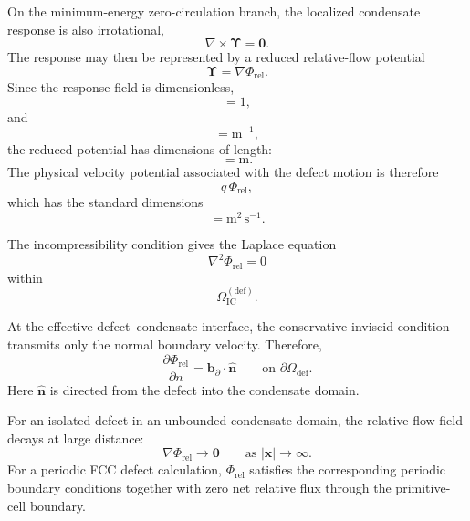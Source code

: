 On the minimum-energy zero-circulation branch, the localized condensate response is also irrotational,
\begin{equation}
    \nabla\times\boldsymbol\Upsilon = \mathbf 0.
\end{equation}
The response may then be represented by a reduced relative-flow potential
\begin{equation}
    \boldsymbol\Upsilon
    =
    \nabla\Phi_{\mathrm{rel}}.
\end{equation}
Since the response field is dimensionless,
\begin{equation}
    [\boldsymbol\Upsilon]=1,
\end{equation}
and
\begin{equation}
    [\nabla]=\mathrm m^{-1},
\end{equation}
the reduced potential has dimensions of length:
\begin{equation}
    [\Phi_{\mathrm{rel}}]=\mathrm m.
\end{equation}
The physical velocity potential associated with the defect motion is therefore
\begin{equation}
    \dot q\,\Phi_{\mathrm{rel}},
\end{equation}
which has the standard dimensions
\begin{equation}
    [\dot q\,\Phi_{\mathrm{rel}}]
    =
    \mathrm{m^2\,s^{-1}}.
\end{equation}

The incompressibility condition gives the Laplace equation
\begin{equation}
    \nabla^2\Phi_{\mathrm{rel}}=0
\end{equation}
within
\begin{equation}
    \Omega_{\mathrm{IC}}^{(\mathrm{def})}.
\end{equation}

At the effective defect--condensate interface, the conservative inviscid condition transmits only the normal boundary velocity. Therefore,
\begin{equation}
    \frac{\partial\Phi_{\mathrm{rel}}}{\partial n}
    =
    \mathbf b_{\partial}\cdot\hat{\mathbf n}
    \qquad
    \text{on }
    \partial\Omega_{\mathrm{def}}.
\end{equation}
Here \(\hat{\mathbf n}\) is directed from the defect into the condensate domain.

For an isolated defect in an unbounded condensate domain, the relative-flow field decays at large distance:
\begin{equation}
    \nabla\Phi_{\mathrm{rel}}
    \rightarrow
    \mathbf 0
    \qquad
    \text{as }
    |\mathbf x|\rightarrow\infty.
\end{equation}
For a periodic FCC defect calculation, \(\Phi_{\mathrm{rel}}\) satisfies the corresponding periodic boundary conditions together with zero net relative flux through the primitive-cell boundary.

